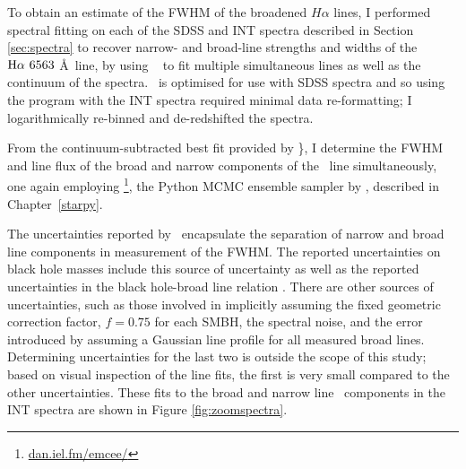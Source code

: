 To obtain an estimate of the FWHM of the broadened $H\alpha$ lines, I performed spectral fitting on each of the SDSS and INT spectra described in Section \ref{sec:spectra} to recover narrow- and broad-line strengths and widths of the $\mha\ 6563$ \AA\ line, by using \gandalf\ \citep{sarzi06} {\notebsm to fit multiple simultaneous lines as well as the continuum of the spectra}. \gandalf\ is optimised for use with SDSS spectra and so using the program with the INT spectra required minimal data re-formatting; I logarithmically re-binned and de-redshifted the spectra. {\notebsm From the continuum-subtracted best fit provided by \gandalf\}, I determine the FWHM and line flux of the broad and narrow components of the \ha\ line simultaneously, one again employing \emcee\footnote{\url{dan.iel.fm/emcee/}}, the Python MCMC ensemble sampler by \cite{emcee13}, described in Chapter~\ref{starpy}. 

The uncertainties reported by \emcee\ encapsulate the separation of narrow and broad line components in measurement of the FWHM. The reported uncertainties on black hole masses include this source of uncertainty as well as the reported uncertainties in the black hole-broad line relation \citep{gh07a}. There are other sources of uncertainties, such as those involved in implicitly assuming the fixed geometric correction factor, $f=0.75$ \citep{netzer90} for each SMBH, the spectral noise, and the error introduced by assuming a Gaussian line profile for all measured broad lines. Determining uncertainties for the last two is outside the scope of this study; based on visual inspection of the line fits, the first is very small compared to the other uncertainties. These fits to the broad and narrow line \ha \ components in the INT spectra are shown in Figure \ref{fig:zoomspectra}.

}
